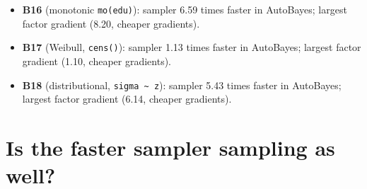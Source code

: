 \documentclass[11pt]{article}
\newcommand{\code}[1]{\texttt{#1}}
\begin{document}
\begin{itemize}
\item \textbf{B16} (monotonic \code{mo(edu)}): sampler 6.59 times faster in AutoBayes; largest factor gradient (8.20, cheaper gradients).
\item \textbf{B17} (Weibull, \code{cens()}): sampler 1.13 times faster in AutoBayes; largest factor gradient (1.10, cheaper gradients).
\item \textbf{B18} (distributional, \code{sigma \textasciitilde{} z}): sampler 5.43 times faster in AutoBayes; largest factor gradient (6.14, cheaper gradients).
\end{itemize}

\section{Is the faster sampler sampling as well?}
\end{document}
